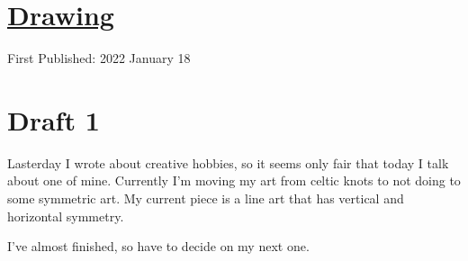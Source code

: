 \documentclass[12pt]{article}[titlepage]
\newcommand{\1}{\={a}}
\newcommand{\2}{\={e}}
\newcommand{\3}{\={\i}}
\newcommand{\4}{\=o}
\newcommand{\5}{\=u}
\newcommand{\6}{\={A}}
\renewcommand{\,}{\textsuperscript{,}}
\begin{document}
\doublespacing
\section{\href{drawing.html}{Drawing}}
First Published: 2022 January 18

\section{Draft 1}
Lasterday I wrote about creative hobbies, so it seems only fair that today I talk about one of mine.
Currently I'm moving my art from celtic knots to not doing to some symmetric art.
My current piece is a line art that has vertical and horizontal symmetry.

I've almost finished, so have to decide on my next one.
\end{document}
